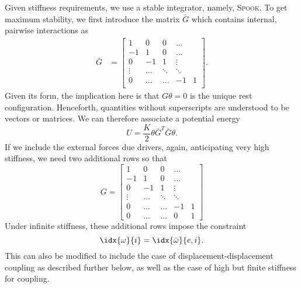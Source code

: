 \documentclass[10pt,notitlepage,abstracton]{scrartcl}
\theoremstyle{plain}
\theoremstyle{plain}
\theoremstyle{plain}
\begin{document}
Given stiffness requirements, we use a stable
integrator, namely, \textsc{Spook}.  To get maximum stability, we first
introduce the matrix  $\bar{G}$ which contains internal, pairwise
interactions as 
\begin{equation}
  \label{eq:15}
  \begin{split}
    \bar{G} & =
    \begin{bmatrix}
      1 &  0  & 0 & \ldots &     \\
      -1 &  1  & 0 &  \ldots    &\\
      0 &  -1  & 1 &   \vdots   &\\
      \vdots & \ldots  & \ddots &\ddots  &    \\
      0 & \ldots  & \ldots &  -1 & 1  \\
    \end{bmatrix}. 
  \end{split}
\end{equation}
Given its form, the implication here is that $G\theta = 0$ is the unique
rest configuration.  Henceforth, quantities without superscripts are
understood to be vectors or matrices.  We can therefore associate a
potential energy
\begin{equation}
  \label{eq:4}
  U  = \frac{K}{2}\theta \bar{G}^{T}\bar{G}\theta. 
\end{equation}
If we include the external forces due drivers, again, anticipating
very high stiffness, we need two additional rows so that
\begin{equation}
  \label{eq:32}
  G  =
  \begin{bmatrix}
    1 &  0  & 0 & \ldots &     \\
    -1 &  1  & 0 &  \ldots    &\\
    0 &  -1  & 1 &   \vdots   &\\
    \vdots & \ldots  & \ddots &\ddots  &    \\
    0 & \ldots  & \ldots &  -1 & 1  \\
    0 & \ldots  & \ldots &  0 & 1 
  \end{bmatrix}
\end{equation}
Under infinite stiffness, these additional rows impose the constraint
\begin{equation}
  \label{eq:5}
\idx{\omega}{i} = \idx{\bar{\omega}}{e,i}. 
\end{equation}
This can also be modified to include the case of displacement-displacement
coupling as described further below, as well as the case of high but finite
stiffness for coupling. 
\end{document}
